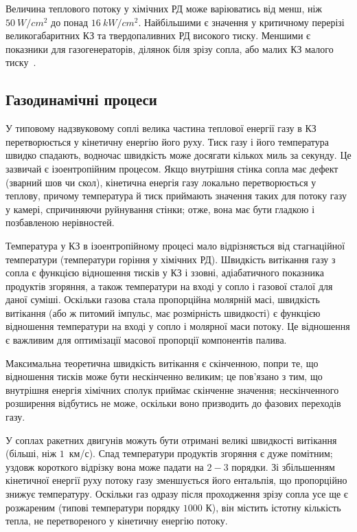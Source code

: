 Величина теплового потоку у хімічних РД може варіюватись від менш, ніж $50~W/cm^{2}$ до понад $16~kW/cm^{2}$. Найбільшими є значення у критичному перерізі великогабаритних КЗ та твердопаливних РД високого тиску. Меншими є показники для газогенераторів, ділянок біля зрізу сопла, або малих КЗ малого тиску~\cite[с. 282 -- 286]{Sutton}.

\subsection{Газодинамічні процеси}

У типовому надзвуковому соплі велика частина теплової енергії газу в КЗ перетворюється у кінетичну енергію його руху. Тиск газу і його температура швидко спадають, водночас швидкість може досягати кількох миль за секунду. Це зазвичай є ізоентропійним процесом. Якщо внутрішня стінка сопла має дефект (зварний шов чи скол), кінетична енергія газу локально перетворюється у теплову, причому температура й тиск приймають значення таких для потоку газу у камері, спричиняючи руйнування стінки; отже, вона має бути гладкою і позбавленою нерівностей.

Температура у КЗ в ізоентропійному процесі мало відрізняється від стагнаційної температури (температури горіння у хімічних РД). Швидкість витікання газу з сопла є функцією відношення тисків у КЗ і ззовні, адіабатичного показника продуктів згоряння, а також температури на вході у сопло і газової сталої для даної суміші. Оскільки газова стала пропорційна молярній масі, швидкість витікання (або ж питомий імпульс, має розмірність швидкості) є функцією відношення температури на вході у сопло і молярної маси потоку. Це відношення є важливим для оптимізації масової пропорції компонентів палива.

Максимальна теоретична швидкість витікання є скінченною, попри те, що відношення тисків може бути нескінченно великим; це пов'язано з тим, що внутрішня енергія хімічних сполук приймає скінченне значення; нескінченного розширення відбутись не може, оскільки воно призводить до фазових переходів газу.

У соплах ракетних двигунів можуть бути отримані великі швидкості витікання (більші, ніж  $1$~км/с). Спад температури продуктів згоряння є дуже помітним; уздовж короткого відрізку вона може падати на  $2-3$ порядки. Зі збільшенням кінетичної енергії руху потоку газу зменшується його ентальпія, що пропорційно знижує температуру. Оскільки газ одразу після проходження зрізу сопла усе ще є розжареним (типові температури порядку $1000$ К), він містить істотну кількість тепла, не перетвореного у кінетичну енергію потоку.


